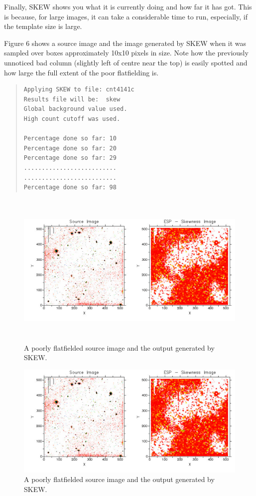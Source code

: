 \documentclass[twoside,11pt]{article}
\newenvironment{latexonly}{}{}
\newenvironment{myquote}{\begin{quote}\begin{small}}{\end{small}\end{quote}}
\begin{document}
Finally, SKEW shows you what it is currently doing and how
far it has got. This is because, for large images, it can
take a considerable time to run, especially, if the template size is large.

Figure 6 shows a source image and the image generated by SKEW when it was sampled
over boxes approximately 10x10 pixels in size. Note how the previously
unnoticed bad column (slightly left of centre near the top) is easily spotted
and how large the full extent of the poor flatfielding is.

\begin{myquote}
\begin{verbatim}
Applying SKEW to file: cnt4141c
Results file will be:  skew
Global background value used.
High count cutoff was used.

Percentage done so far: 10
Percentage done so far: 20
Percentage done so far: 29
..........................
..........................
Percentage done so far: 98
\end{verbatim}
\end{myquote}

\begin{latexonly}
\begin{figure}[htlb]
\centering
\includegraphics[height=75mm,width=150mm]{sun180_diag6}
\caption{A poorly flatfielded source image and the output generated by SKEW.}
\end{figure}
\end{latexonly}
\begin{htmlonly}
\begin{figure}[htlb]
\centering
\includegraphics{sun180_diag6}
\caption{A poorly flatfielded source image and the output generated by SKEW.}
\end{figure}
\end{htmlonly}
\end{document}
